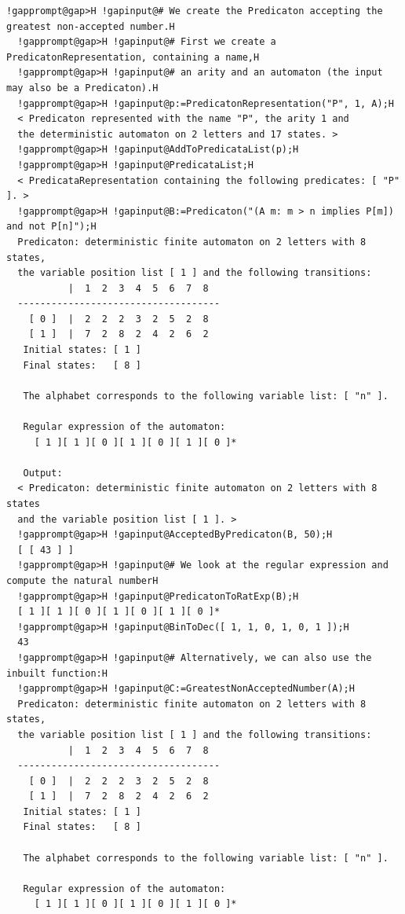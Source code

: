 \documentclass[a4paper,11pt]{report}
\begin{document}
{{{\begin{Verbatim}[commandchars=!@H,fontsize=\small,frame=single,label=Example]
  !gapprompt@gap>H !gapinput@# We create the Predicaton accepting the greatest non-accepted number.H
  !gapprompt@gap>H !gapinput@# First we create a PredicatonRepresentation, containing a name,H
  !gapprompt@gap>H !gapinput@# an arity and an automaton (the input may also be a Predicaton).H
  !gapprompt@gap>H !gapinput@p:=PredicatonRepresentation("P", 1, A);H
  < Predicaton represented with the name "P", the arity 1 and 
  the deterministic automaton on 2 letters and 17 states. >
  !gapprompt@gap>H !gapinput@AddToPredicataList(p);H
  !gapprompt@gap>H !gapinput@PredicataList;H
  < PredicataRepresentation containing the following predicates: [ "P" ]. >
  !gapprompt@gap>H !gapinput@B:=Predicaton("(A m: m > n implies P[m]) and not P[n]");H
  Predicaton: deterministic finite automaton on 2 letters with 8 states, 
  the variable position list [ 1 ] and the following transitions:
           |  1  2  3  4  5  6  7  8  
  ------------------------------------
    [ 0 ]  |  2  2  2  3  2  5  2  8  
    [ 1 ]  |  7  2  8  2  4  2  6  2  
   Initial states: [ 1 ]
   Final states:   [ 8 ]
  
   The alphabet corresponds to the following variable list: [ "n" ].
  
   Regular expression of the automaton:
     [ 1 ][ 1 ][ 0 ][ 1 ][ 0 ][ 1 ][ 0 ]*
  
   Output:
  < Predicaton: deterministic finite automaton on 2 letters with 8 states 
  and the variable position list [ 1 ]. >
  !gapprompt@gap>H !gapinput@AcceptedByPredicaton(B, 50);H
  [ [ 43 ] ]
  !gapprompt@gap>H !gapinput@# We look at the regular expression and compute the natural numberH
  !gapprompt@gap>H !gapinput@PredicatonToRatExp(B);H
  [ 1 ][ 1 ][ 0 ][ 1 ][ 0 ][ 1 ][ 0 ]*
  !gapprompt@gap>H !gapinput@BinToDec([ 1, 1, 0, 1, 0, 1 ]);H
  43
  !gapprompt@gap>H !gapinput@# Alternatively, we can also use the inbuilt function:H
  !gapprompt@gap>H !gapinput@C:=GreatestNonAcceptedNumber(A);H
  Predicaton: deterministic finite automaton on 2 letters with 8 states, 
  the variable position list [ 1 ] and the following transitions:
           |  1  2  3  4  5  6  7  8  
  ------------------------------------
    [ 0 ]  |  2  2  2  3  2  5  2  8  
    [ 1 ]  |  7  2  8  2  4  2  6  2  
   Initial states: [ 1 ]
   Final states:   [ 8 ]
  
   The alphabet corresponds to the following variable list: [ "n" ].
  
   Regular expression of the automaton:
     [ 1 ][ 1 ][ 0 ][ 1 ][ 0 ][ 1 ][ 0 ]*
  

\end{Verbatim}}}}
\end{document}
